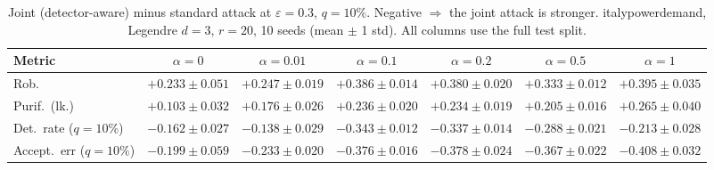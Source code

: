 \begin{table}[htbp]
  \centering
  \small
  \begin{tabular}{@{}lcccccc@{}}
    \toprule
    Metric & $\alpha{=}0$ & $\alpha{=}0.01$ & $\alpha{=}0.1$ & $\alpha{=}0.2$ & $\alpha{=}0.5$ & $\alpha{=}1$ \\
    \midrule
    Rob. & $+0.233 \pm 0.051$ & $+0.247 \pm 0.019$ & $+0.386 \pm 0.014$ & $+0.380 \pm 0.020$ & $+0.333 \pm 0.012$ & $+0.395 \pm 0.035$ \\
    Purif.\ (lk.) & $+0.103 \pm 0.032$ & $+0.176 \pm 0.026$ & $+0.236 \pm 0.020$ & $+0.234 \pm 0.019$ & $+0.205 \pm 0.016$ & $+0.265 \pm 0.040$ \\
    Det.\ rate ($q{=}10\%$) & $-0.162 \pm 0.027$ & $-0.138 \pm 0.029$ & $-0.343 \pm 0.012$ & $-0.337 \pm 0.014$ & $-0.288 \pm 0.021$ & $-0.213 \pm 0.028$ \\
    Accept.\ err ($q{=}10\%$) & $-0.199 \pm 0.059$ & $-0.233 \pm 0.020$ & $-0.376 \pm 0.016$ & $-0.378 \pm 0.024$ & $-0.367 \pm 0.022$ & $-0.408 \pm 0.032$ \\
    \bottomrule
  \end{tabular}
  \caption{Joint (detector-aware) minus standard attack at $\varepsilon=0.3$, $q{=}10\%$. Negative $\Rightarrow$ the joint attack is stronger. italypowerdemand, Legendre $d{=}3$, $r{=}20$, 10 seeds (mean $\pm$ 1 std). All columns use the full test split.}
  \label{tab:italypowerdemand_joint_r20_eps0.3}
\end{table}
